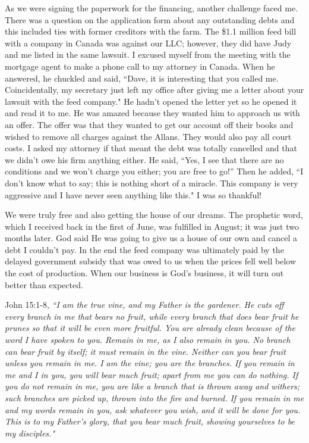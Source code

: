 \documentclass[oneside,12pt]{book}
\begin{document}
As we were signing the paperwork for the financing, another challenge faced me. There was a question on the application form about any outstanding debts and this included ties with former creditors with the farm. The \$1.1 million feed bill with a company in Canada was against our LLC; however, they did have Judy and me listed in the same lawsuit. I excused myself from the meeting with the mortgage agent to make a phone call to my attorney in Canada. When he answered, he chuckled and said, ``Dave, it is interesting that you called me. Coincidentally, my secretary just left my office after giving me a letter about your lawsuit with the feed company." He hadn't opened the letter yet so he opened it and read it to me. He was amazed because they wanted him to approach us with an offer. The offer was that they wanted to get our account off their books and wished to remove all charges against the Allans. They would also pay all court costs. I asked my attorney if that meant the debt was totally cancelled and that we didn't owe his firm anything either. He said, ``Yes, I see that there are no conditions and we won't charge you either; you are free to go!'' Then he added, ``I don't know what to say; this is nothing short of a miracle. This company is very aggressive and I have never seen anything like this." I was so thankful!

We were truly free and also getting the house of our dreams. The prophetic word, which I received back in the first of June, was fulfilled in August; it was just two months later. God said He was going to give us a house of our own and cancel a debt I couldn't pay. In the end the feed company was ultimately paid by the delayed government subsidy that was owed to us when the prices fell well below the cost of production. When our business is God's business, it will turn out better than expected. 

John 15:1-8, \textit{``I am the true vine, and my Father is the gardener. He cuts off every branch in me that bears no fruit, while every branch that does bear fruit he prunes so that it will be even more fruitful. You are already clean because of the word I have spoken to you. Remain in me, as I also remain in you. No branch can bear fruit by itself; it must remain in the vine. Neither can you bear fruit unless you remain in me. I am the vine; you are the branches. If you remain in me and I in you, you will bear much fruit; apart from me you can do nothing. If you do not remain in me, you are like a branch that is thrown away and withers; such branches are picked up, thrown into the fire and burned. If you remain in me and my words remain in you, ask whatever you wish, and it will be done for you. This is to my Father's glory, that you bear much fruit, showing yourselves to be my disciples."}
\end{document}
